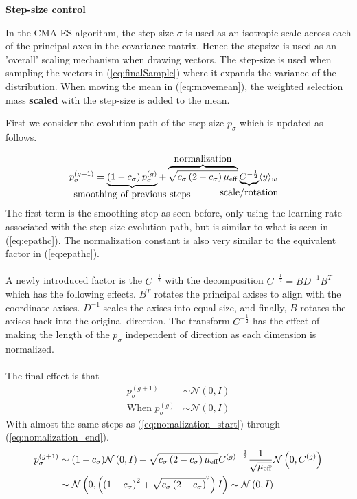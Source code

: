\textbf{Step-size control}

In the CMA-ES algorithm, the step-size $\sigma$ is used as an isotropic scale across
each of the principal axes in the covariance matrix. Hence the stepsize is used as 
an 'overall' scaling mechanism when drawing vectors. The step-size is used when 
sampling the vectors in (\ref{eq:finalSample}) where it expands the variance 
of the distribution. When moving the mean in (\ref{eq:movemean}), the weighted 
selection mass \textbf{scaled} with the step-size is added to the mean.

First we consider the evolution path of the step-size $p_\sigma$ which is
updated as follows.

\begin{align}
p_{\sigma}^{(g+1)} &= 
\underbrace{\left( 1 - c_{\sigma} \right) p_{\sigma}^{(g)}}_{
\makebox[0pt]{\text{{smoothing of previous steps}}}
}
+ 
\overbrace{\sqrt{c_{\sigma} \left( 2 - c_{\sigma} \right) \meff}}
^{
\makebox[0pt]{\text{{normalization}}}
} 
\underbrace{C^{- \frac{1}{2}}}_{
\makebox[0pt]{\text{{scale/rotation}}}
}
\langle y \rangle_{w}
\end{align}
The first term is the smoothing step as seen before, only using the learning rate 
associated with the step-size evolution path, but is similar to what is seen in
(\ref{eq:epathc}). The normalization constant is also very similar to the
equivalent factor in (\ref{eq:epathc}).\\
\\
A newly introduced factor is the $C^{-\frac{1}{2}}$ with the decomposition
$C^{-\frac{1}{2}} = B D^{-1} B^{T}$ which has the following effects. $B^{T}$
rotates the principal axises to align with the coordinate axises. 
$D^{-1}$ scales the axises into equal size, and finally, $B$ rotates the 
axises back into the original direction. The transform $C^{-\frac{1}{2}}$
has the effect of making the length of the $p_\sigma$ independent of 
direction as each dimension is normalized.\\
\\
The final effect is that
\begin{align}
p_\sigma^{(g+1)} &\sim \mathcal{N}\left(0, I \right)\\
\text{When }
p_\sigma^{(g)} &\sim \mathcal{N} \left(0, I \right)
\end{align}
With almost the same steps as (\ref{eq:nomalization_start}) through 
(\ref{eq:nomalization_end}).
\begin{align}
p_\sigma^{(g+1)} &\sim (1 - c_\sigma) \mathcal{N}\left( 0, I \right) + \sqrt{c_\sigma 
\left( 2-c_\sigma \right)\mu_{\text{eff}} } {C^{(g)}}^{-\frac{1}{2}} \frac{1}{\sqrt{\mu_{\text{eff}}}}
\mathcal{N} \left( 0, C^{(g)} \right)\\
&\sim \mathcal{N} 
\left( 
  0, 
  \left(  
    \left( 
      1-c_\sigma 
    \right)^2 + \sqrt{c_\sigma 
    \left(  
      2 - c_\sigma
    \right)}^2
  \right) I
\right) \sim \mathcal{N} \left( 0, I \right)
\end{align}

